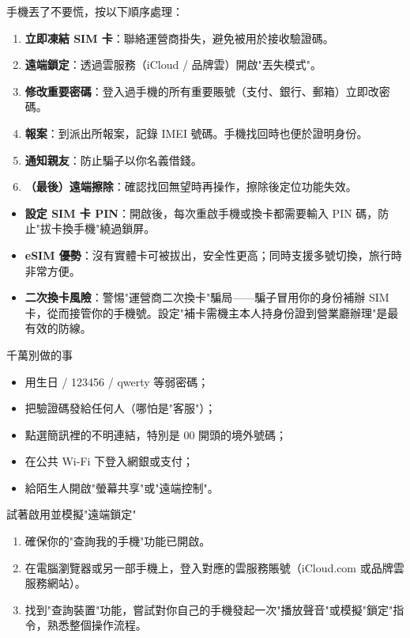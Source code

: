 
手機丟了不要慌，按以下順序處理：

\begin{enumerate}
  \item \textbf{立即凍結 SIM 卡}：聯絡運營商掛失，避免被用於接收驗證碼。
  \item \textbf{遠端鎖定}：透過雲服務（iCloud / 品牌雲）開啟"丟失模式"。
  \item \textbf{修改重要密碼}：登入過手機的所有重要賬號（支付、銀行、郵箱）立即改密碼。
  \item \textbf{報案}：到派出所報案，記錄 IMEI 號碼。手機找回時也便於證明身份。
  \item \textbf{通知親友}：防止騙子以你名義借錢。
  \item \textbf{（最後）遠端擦除}：確認找回無望時再操作，擦除後定位功能失效。
\end{enumerate}


\begin{itemize}
  \item \textbf{設定 SIM 卡 PIN}：開啟後，每次重啟手機或換卡都需要輸入 PIN 碼，防止"拔卡換手機"繞過鎖屏。
  \item \textbf{eSIM 優勢}：沒有實體卡可被拔出，安全性更高；同時支援多號切換，旅行時非常方便。
  \item \textbf{二次換卡風險}：警惕"運營商二次換卡"騙局——騙子冒用你的身份補辦 SIM 卡，從而接管你的手機號。設定"補卡需機主本人持身份證到營業廳辦理"是最有效的防線。
\end{itemize}

\begin{tcbwarn}{千萬別做的事}
\begin{itemize}
  \item 用生日 / 123456 / qwerty 等弱密碼；
  \item 把驗證碼發給任何人（哪怕是"客服"）；
  \item 點選簡訊裡的不明連結，特別是 00 開頭的境外號碼；
  \item 在公共 Wi-Fi 下登入網銀或支付；
  \item 給陌生人開啟"螢幕共享"或"遠端控制"。
\end{itemize}

\end{tcbwarn}

\begin{tcbpractice}{試著啟用並模擬"遠端鎖定"}
\begin{enumerate}
  \item 確保你的"查詢我的手機"功能已開啟。
  \item 在電腦瀏覽器或另一部手機上，登入對應的雲服務賬號（iCloud.com 或品牌雲服務網站）。
  \item 找到"查詢裝置"功能，嘗試對你自己的手機發起一次"播放聲音"或模擬"鎖定"指令，熟悉整個操作流程。
\end{enumerate}

\end{tcbpractice}
